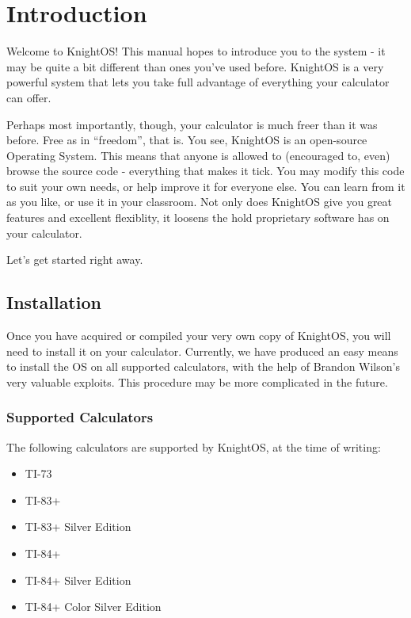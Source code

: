 \chapter{Introduction}

Welcome to KnightOS! This manual hopes to introduce you to the system - it may be
quite a bit different than ones you've used before. KnightOS is a very powerful
system that lets you take full advantage of everything your calculator can offer.

Perhaps most importantly, though, your calculator is much freer than it was
before. Free as in ``freedom'', that is. You see, KnightOS is an open-source
Operating System. This means that anyone is allowed to (encouraged to, even)
browse the source code - everything that makes it tick. You may modify this code
to suit your own needs, or help improve it for everyone else. You can learn from
it as you like, or use it in your classroom. Not only does KnightOS give you great
features and excellent flexiblity, it loosens the hold proprietary software has on
your calculator.

Let's get started right away.

\section{Installation}

Once you have acquired or compiled your very own copy of KnightOS, you will need
to install it on your calculator. Currently, we have produced an easy means to
install the OS on all supported calculators, with the help of Brandon Wilson's
very valuable exploits. This procedure may be more complicated in the future.

\subsection{Supported Calculators}

The following calculators are supported by KnightOS, at the time of writing:

\begin{itemize}
    \item TI-73
    \item TI-83+
    \item TI-83+ Silver Edition
    \item TI-84+
    \item TI-84+ Silver Edition
    \item TI-84+ Color Silver Edition
\end{itemize}

